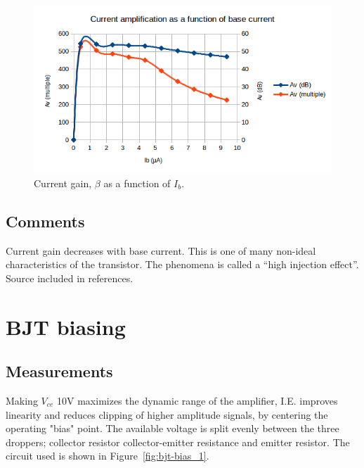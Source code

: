 \documentclass[11pt,a4paper]{article}
\begin{document}
\begin{figure}[htbp]
    \centering
    \includegraphics[width=\textwidth]{img/ic-ib-amplification_plot.png}
    \caption{Current gain, $\beta$ as a function of $I_{b}$.}
    \label{fig:ic-ib-amplification_plot}
\end{figure}


\subsection{Comments}\label{comments}

Current gain decreases with base current. This is one of many non-ideal
characteristics of the transistor. The phenomena is called a ``high
injection effect''. Source included in references.


\section{BJT biasing}\label{bjt-biasing}

\subsection{Measurements}\label{bjt-biasing-measurements}
Making $V_{ce}$ 10V maximizes the dynamic range of the amplifier, I.E. improves
linearity and reduces clipping of higher amplitude signals, by centering the
operating "bias" point. The available voltage is split evenly between the three
droppers; collector resistor collector-emitter resistance and emitter resistor.
The circuit used is shown in Figure~\ref{fig:bjt-bias_1}.
\end{document}

